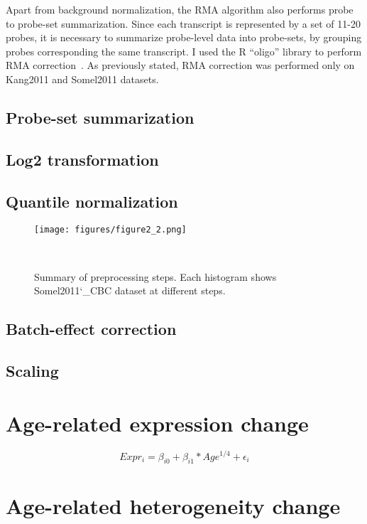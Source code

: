 Apart from background normalization, the RMA algorithm also performs probe to probe-set summarization. 
Since each transcript is represented by a set of 11-20 probes, it is necessary to summarize probe-level data into probe-sets, 
by grouping probes corresponding the same transcript. I used the R ``oligo'' library to perform RMA correction~\cite{Carvalho2010}.
As previously stated, RMA correction was performed only on Kang2011 and Somel2011 datasets.

\subsection{Probe-set summarization}

\subsection{Log2 transformation}

\subsection{Quantile normalization}

\begin{figure}[h]
\centering
\texttt{[image: figures/figure2\_2.png]}
\caption{Summary of preprocessing steps. Each histogram shows Somel2011\char`_CBC dataset at different steps.}~\label{fig:fig2.2}
\end{figure}

\subsection{Batch-effect correction}

\subsection{Scaling}

\section{Age-related expression change}

\begin{equation}
    Expr_i = \beta_{i0} + \beta_{i1} * Age^{1/4} + \epsilon_i
    \label{eq:exp_change}
\end{equation}

\section{Age-related heterogeneity change}


